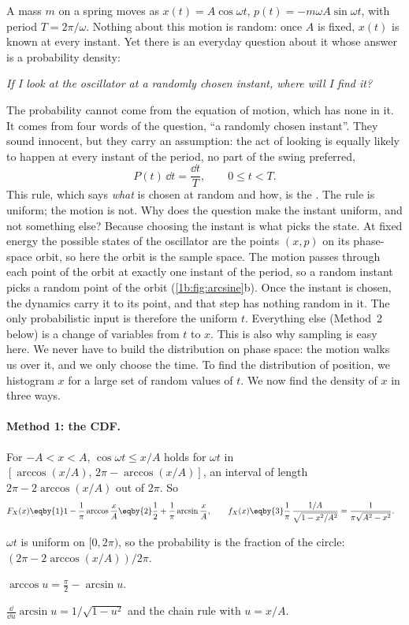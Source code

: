 A mass $m$ on a spring moves as $x(t)=A\cos\omega t$, $p(t)=-m\omega A\sin\omega t$,
with period $T=2\pi/\omega$. Nothing about this motion is random: once $A$ is
fixed, $x(t)$ is known at every instant. Yet there is an everyday question about it
whose answer is a probability density:
\begin{center}
  \emph{If I look at the oscillator at a randomly chosen instant, where will I find it?}
\end{center}
The probability cannot come from the equation of motion, which has none in it. It
comes from four words of the question, ``a randomly chosen instant''. They sound
innocent, but they carry an assumption: the act of looking is equally likely to
happen at every instant of the period, no part of the swing preferred,
\begin{equation*}
  P(t)\,\dd t=\frac{\dd t}{T},\qquad 0\le t<T .
\end{equation*}
This rule, which says \emph{what} is chosen at random and how, is the
. The rule is uniform; the motion is not.
Why does the question make the instant uniform, and not something else?
Because choosing the instant is what picks the state. At fixed energy the
possible states of the oscillator are the points $(x,p)$ on its phase-space
orbit, so here the orbit is the sample space. The motion passes through each
point of the orbit at exactly one instant of the period, so a random instant
picks a random point of the orbit (\cref{1b:fig:arcsine}b). Once the instant
is chosen, the dynamics carry it to its point, and that step has nothing
random in it. The only probabilistic input is therefore the uniform $t$.
Everything else (Method~2 below) is a change of variables from $t$ to $x$.
This is also why sampling is easy here. We never have to build the
distribution on phase space: the motion walks us over it, and we only choose
the time. To find the distribution of position, we histogram $x$ for a large
set of random values of $t$. We now find the density of $x$ in three ways.

\paragraph{Method 1: the CDF.} For $-A<x<A$, $\cos\omega t\le x/A$ holds for
$\omega t$ in $[\arccos(x/A),\,2\pi-\arccos(x/A)]$, an interval of length
$2\pi-2\arccos(x/A)$ out of $2\pi$. So
\begin{align*}
  F_X(x)
  &\eqby{1} 1-\frac{1}{\pi}\arccos\frac xA
   \eqby{2} \frac12+\frac1\pi\arcsin\frac xA,
  \qquad
  f_X(x)\eqby{3}\frac1\pi\,\frac{1/A}{\sqrt{1-x^2/A^2}}
   = \frac{1}{\pi\sqrt{A^2-x^2}} .
\end{align*}
\begin{explain}
  \item $\omega t$ is uniform on $[0,2\pi)$, so the probability is the
        fraction of the circle: $(2\pi-2\arccos(x/A))/2\pi$.
  \item $\arccos u=\tfrac\pi2-\arcsin u$.
  \item $\frac{\dd}{\dd u}\arcsin u=1/\sqrt{1-u^2}$ and the chain rule with
        $u=x/A$.
\end{explain}


